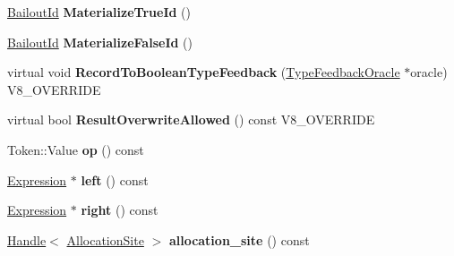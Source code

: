 \begin{DoxyCompactItemize}
\item 
\hypertarget{classv8_1_1internal_1_1_v8___f_i_n_a_l_a8afe069e5cf3278c4b5d51bdda4c28c6}{}\hyperlink{classv8_1_1internal_1_1_bailout_id}{Bailout\+Id} {\bfseries Materialize\+True\+Id} ()\label{classv8_1_1internal_1_1_v8___f_i_n_a_l_a8afe069e5cf3278c4b5d51bdda4c28c6}

\item 
\hypertarget{classv8_1_1internal_1_1_v8___f_i_n_a_l_a3609154630456ee7b197f0131e745a6e}{}\hyperlink{classv8_1_1internal_1_1_bailout_id}{Bailout\+Id} {\bfseries Materialize\+False\+Id} ()\label{classv8_1_1internal_1_1_v8___f_i_n_a_l_a3609154630456ee7b197f0131e745a6e}

\item 
\hypertarget{classv8_1_1internal_1_1_v8___f_i_n_a_l_a51949e7b3622c90c9584f38a0a0920af}{}virtual void {\bfseries Record\+To\+Boolean\+Type\+Feedback} (\hyperlink{classv8_1_1internal_1_1_type_feedback_oracle}{Type\+Feedback\+Oracle} $\ast$oracle) V8\+\_\+\+O\+V\+E\+R\+R\+I\+D\+E\label{classv8_1_1internal_1_1_v8___f_i_n_a_l_a51949e7b3622c90c9584f38a0a0920af}

\item 
\hypertarget{classv8_1_1internal_1_1_v8___f_i_n_a_l_a8c26ec29377e79ac9af648b28a4a9e27}{}virtual bool {\bfseries Result\+Overwrite\+Allowed} () const V8\+\_\+\+O\+V\+E\+R\+R\+I\+D\+E\label{classv8_1_1internal_1_1_v8___f_i_n_a_l_a8c26ec29377e79ac9af648b28a4a9e27}

\item 
\hypertarget{classv8_1_1internal_1_1_v8___f_i_n_a_l_a7888b5a094e42a12307cd150fdbe678f}{}Token\+::\+Value {\bfseries op} () const \label{classv8_1_1internal_1_1_v8___f_i_n_a_l_a7888b5a094e42a12307cd150fdbe678f}

\item 
\hypertarget{classv8_1_1internal_1_1_v8___f_i_n_a_l_ad0af0a356ee33837801209e5acc04d78}{}\hyperlink{classv8_1_1internal_1_1_expression}{Expression} $\ast$ {\bfseries left} () const \label{classv8_1_1internal_1_1_v8___f_i_n_a_l_ad0af0a356ee33837801209e5acc04d78}

\item 
\hypertarget{classv8_1_1internal_1_1_v8___f_i_n_a_l_a87f3521e7083bb8a9d897949faea074e}{}\hyperlink{classv8_1_1internal_1_1_expression}{Expression} $\ast$ {\bfseries right} () const \label{classv8_1_1internal_1_1_v8___f_i_n_a_l_a87f3521e7083bb8a9d897949faea074e}

\item 
\hypertarget{classv8_1_1internal_1_1_v8___f_i_n_a_l_a952f2e23ecf5ce2c5a5004b83f375c1d}{}\hyperlink{classv8_1_1internal_1_1_handle}{Handle}$<$ \hyperlink{classv8_1_1internal_1_1_allocation_site}{Allocation\+Site} $>$ {\bfseries allocation\+\_\+site} () const \label{classv8_1_1internal_1_1_v8___f_i_n_a_l_a952f2e23ecf5ce2c5a5004b83f375c1d}


\end{DoxyCompactItemize}
